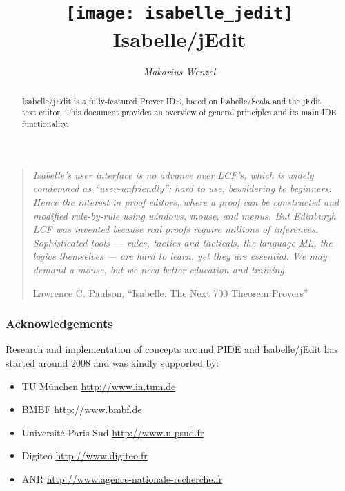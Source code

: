 \documentclass[12pt,a4paper]{report}
\title{\texttt{[image: isabelle\_jedit]} \\[4ex] Isabelle/jEdit}
\author{\emph{Makarius Wenzel}}
\begin{document}
\maketitle

\begin{abstract}
  Isabelle/jEdit is a fully-featured Prover IDE, based on Isabelle/Scala and
  the jEdit text editor. This document provides an overview of general
  principles and its main IDE functionality.
\end{abstract}

\vspace*{2.5cm}

\begin{quote}
  {\small\em Isabelle's user interface is no advance over LCF's, which is
  widely condemned as ``user-unfriendly'': hard to use, bewildering to
  beginners. Hence the interest in proof editors, where a proof can be
  constructed and modified rule-by-rule using windows, mouse, and menus. But
  Edinburgh LCF was invented because real proofs require millions of
  inferences. Sophisticated tools --- rules, tactics and tacticals, the
  language ML, the logics themselves --- are hard to learn, yet they are
  essential. We may demand a mouse, but we need better education and
  training.}

  Lawrence C. Paulson, ``Isabelle: The Next 700 Theorem Provers''
\end{quote}


\vspace*{2.5cm}


\subsubsection*{Acknowledgements}

Research and implementation of concepts around PIDE and Isabelle/jEdit has
started around 2008 and was kindly supported by:
\begin{itemize}
\item TU M\"unchen \url{http://www.in.tum.de}
\item BMBF \url{http://www.bmbf.de}
\item Universit\'e Paris-Sud \url{http://www.u-psud.fr}
\item Digiteo \url{http://www.digiteo.fr}
\item ANR \url{http://www.agence-nationale-recherche.fr}
\end{itemize}


\tableofcontents
\listoffigures
\clearfirst



\begingroup
  \tocentry{\bibname}
   \small\raggedright\frenchspacing
  
\endgroup

\tocentry{\indexname}
\printindex
\end{document}
